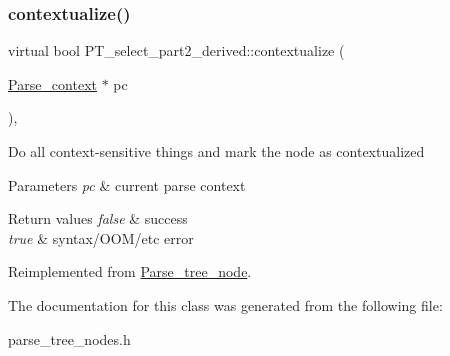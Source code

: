 \subsubsection{\texorpdfstring{contextualize()}{contextualize()}}
{\footnotesize\ttfamily virtual bool P\+T\+\_\+select\+\_\+part2\+\_\+derived\+::contextualize (\begin{DoxyParamCaption}\item[{\mbox{\hyperlink{structParse__context}{Parse\+\_\+context}} $\ast$}]{pc }\end{DoxyParamCaption})\hspace{0.3cm}{\ttfamily [inline]}, {\ttfamily [virtual]}}

Do all context-\/sensitive things and mark the node as contextualized


\begin{DoxyParams}{Parameters}
{\em pc} & current parse context\\
\hline
\end{DoxyParams}

\begin{DoxyRetVals}{Return values}
{\em false} & success \\
\hline
{\em true} & syntax/\+O\+O\+M/etc error \\
\hline
\end{DoxyRetVals}


Reimplemented from \mbox{\hyperlink{classParse__tree__node_a22d93524a537d0df652d7efa144f23da}{Parse\+\_\+tree\+\_\+node}}.



The documentation for this class was generated from the following file\+:\begin{DoxyCompactItemize}
\item 
parse\+\_\+tree\+\_\+nodes.\+h\end{DoxyCompactItemize}
